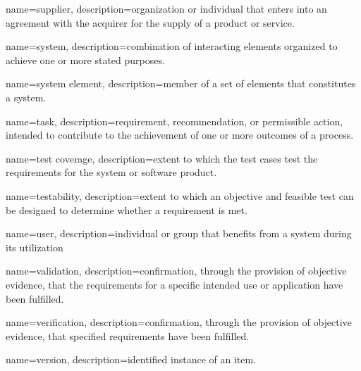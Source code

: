 {
	name=supplier,
	description={organization or individual that enters into an agreement with the acquirer for the supply of a product or service.}
}

{
	name=system,
	description={combination of interacting elements organized to achieve one or more stated purposes.}
}

{
	name=system element,
	description={member of a set of elements that constitutes a system.}
}



{
	name=task,
	description={requirement, recommendation, or permissible action, intended to contribute to the achievement of one or more outcomes of a process.}
}

{
	name=test coverage,
	description={extent to which the test cases test the requirements for the system or software product.}
}

{
	name=testability,
	description={extent to which an objective and feasible test can be designed to determine whether a requirement is met.}
}



{
	name=user,
	description={individual or group that benefits from a system during its utilization}
}



{
	name=validation,
	description={confirmation, through the provision of objective evidence, that the requirements for a specific intended use or application have been fulfilled.}
}

{
	name=verification,
	description={confirmation, through the provision of objective evidence, that specified requirements have been fulfilled.}
}

{
	name=version,
	description={identified instance of an item.}
}